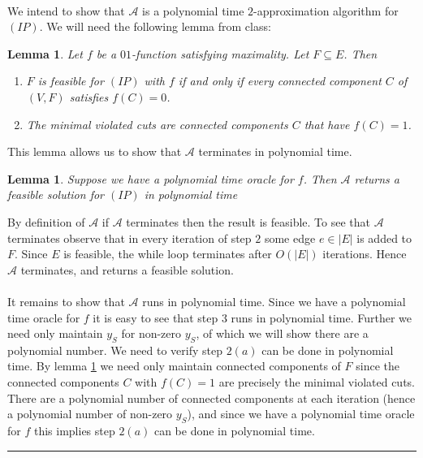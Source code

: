 \documentclass[letterpaper,12pt,oneside,onecolumn]{article}
\newcommand{\cA}{\mathcal{A}} \newcommand{\cB}{\mathcal{B}}
\newenvironment{proof}{{\bf Proof:  }}{\hfill\rule{2mm}{2mm}}
\newtheorem{lemma}[fact]{Lemma}
\begin{document}
\paragraph{}
We intend to show that $\cA$ is a polynomial time $2$-approximation algorithm for $(IP)$. We will need the following lemma from class:
\begin{lemma}\label{lemma:maximality}
Let $f$ be a $01$-function satisfying maximality. Let $F\subseteq E$. Then
\begin{enumerate}
\item $F$ is feasible for $(IP)$ with $f$ if and only if every connected component $C$ of $(V,F)$ satisfies $f(C) = 0$.
\item The minimal violated cuts are connected components $C$ that have $f(C) = 1$.
\end{enumerate}
\end{lemma}
This lemma allows us to show that $\cA$ terminates in polynomial time.
\begin{lemma}\label{lemma:poly1}
Suppose we have a polynomial time oracle for $f$. Then $\cA$ returns a feasible solution for $(IP)$ in polynomial time
\end{lemma}
\begin{proof}
By definition of $\cA$ if $\cA$ terminates then the result is feasible. To see that $\cA$ terminates observe that in every iteration of step $2$ some edge $e \in |E|$ is added to $F$. Since $E$ is feasible, the while loop terminates after $O(|E|)$ iterations. Hence $\cA$ terminates, and returns a feasible solution.
\paragraph{} 
It remains to show that $\cA$ runs in polynomial time. Since we have a polynomial time oracle for $f$ it is easy to see that step $3$ runs in polynomial time. Further we need only maintain $y_S$ for non-zero $y_S$, of which we will show there are a polynomial number. We need to verify step $2(a)$ can be done in polynomial time. By lemma \ref{lemma:maximality} we need only maintain connected components of $F$ since the connected components $C$ with $f(C) = 1$ are precisely the minimal violated cuts. There are a polynomial number of connected components at each iteration (hence a polynomial number of non-zero $y_S$), and since we have a polynomial time oracle for $f$ this implies step $2(a)$ can be done in polynomial time.
\end{proof}
\end{document}
